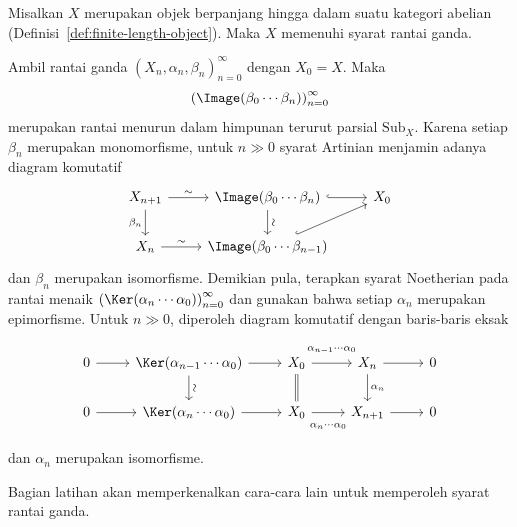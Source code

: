 \begin{proposisi}
	Misalkan $X$ merupakan objek berpanjang hingga dalam suatu kategori abelian
	(Definisi~\ref{def:finite-length-object}). Maka $X$ memenuhi syarat rantai
	ganda.
\end{proposisi}
\begin{bukti}
	Ambil rantai ganda $(X_n,\alpha_n,\beta_n)_{n=0}^\infty$ dengan
	$X_0=X$. Maka
	\[
		\left(\Image(\beta_0\cdots\beta_n)\right)_{n=0}^\infty
	\]
	merupakan rantai
	menurun dalam himpunan terurut parsial $\mathrm{Sub}_X$. Karena setiap
	$\beta_n$ merupakan monomorfisme, untuk $n\gg 0$ syarat Artinian menjamin
	adanya diagram komutatif
	\[\begin{tikzcd}
		X_{n+1} \arrow[d, "\beta_n"'] \arrow[r, "\sim"] & \Image(\beta_0 \cdots \beta_n) \arrow[d, "\sim" sloped] \arrow[hookrightarrow, r] & X_0 \\
		X_n \arrow[r, "\sim"] & \Image(\beta_0 \cdots \beta_{n-1}) \arrow[hookrightarrow, ru] &
	\end{tikzcd}\]
	dan $\beta_n$ merupakan isomorfisme. Demikian pula, terapkan syarat
	Noetherian pada rantai menaik
	$\left(\Ker(\alpha_n\cdots\alpha_0)\right)_{n=0}^\infty$ dan gunakan
	bahwa setiap $\alpha_n$ merupakan epimorfisme. Untuk $n\gg 0$, diperoleh
	diagram komutatif
	dengan baris-baris eksak
	\[\begin{tikzcd}
		0 \arrow[r] & \Ker(\alpha_{n-1} \cdots \alpha_0) \arrow[d, "\sim" sloped] \arrow[r] & X_0 \arrow[r, "{\alpha_{n-1} \cdots \alpha_0}" inner sep=0.7em] \arrow[equal, d] & X_n \arrow[d, "{\alpha_n}"] \arrow[r] & 0 \\
		0 \arrow[r] & \Ker(\alpha_n \cdots \alpha_0) \arrow[r] & X_0 \arrow[r, "{\alpha_n \cdots \alpha_0}"' inner sep=0.7em] & X_{n+1} \arrow[r] & 0
	\end{tikzcd}\]
	dan $\alpha_n$ merupakan isomorfisme.
\end{bukti}

Bagian latihan akan memperkenalkan cara-cara lain untuk memperoleh syarat
rantai ganda.
